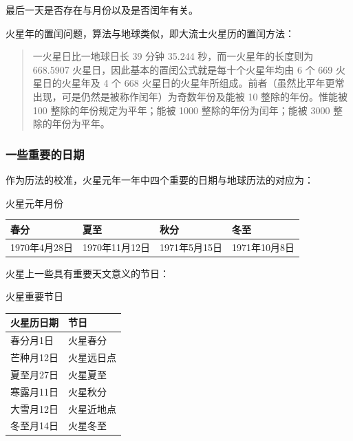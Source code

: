\documentclass[letterpaper,10pt]{sphinxmanual}
\begin{document}
最后一天是否存在与月份以及是否闰年有关。

火星年的置闰问题，算法与地球类似，即大流士火星历的置闰方法：
\begin{quote}

一火星日比一地球日长 39 分钟 35.244 秒，而一火星年的长度则为 668.5907 火星日，因此基本的置闰公式就是每十个火星年均由 6 个 669 火星日的火星年及 4 个 668 火星日的火星年所组成。前者（虽然比平年更常出现，可是仍然是被称作闰年）为奇数年份及能被 10 整除的年份。惟能被 100 整除的年份规定为平年；能被 1000 整除的年份为闰年；能被 3000 整除的年份为平年。
\end{quote}


\subsubsection{一些重要的日期}
\label{mars:id21}
作为历法的校准，火星元年一年中四个重要的日期与地球历法的对应为：


\begin{threeparttable}
\capstart\caption{火星元年月份}

\begin{tabulary}{\linewidth}{|L|L|L|L|}
\hline
\textsf{\relax 
春分
} & \textsf{\relax 
夏至
} & \textsf{\relax 
秋分
} & \textsf{\relax 
冬至
}\\
\hline
1970年4月28日
 & 
1970年11月12日
 & 
1971年5月15日
 & 
1971年10月8日
\\
\hline\end{tabulary}

\end{threeparttable}


火星上一些具有重要天文意义的节日：


\begin{threeparttable}
\capstart\caption{火星重要节日}

\begin{tabulary}{\linewidth}{|L|L|}
\hline
\textsf{\relax 
火星历日期
} & \textsf{\relax 
节日
}\\
\hline
春分月1日
 & 
火星春分
\\

芒种月12日
 & 
火星远日点
\\

夏至月27日
 & 
火星夏至
\\

寒露月11日
 & 
火星秋分
\\

大雪月12日
 & 
火星近地点
\\

冬至月14日
 & 
火星冬至
\\
\hline\end{tabulary}

\end{threeparttable}
\end{document}
